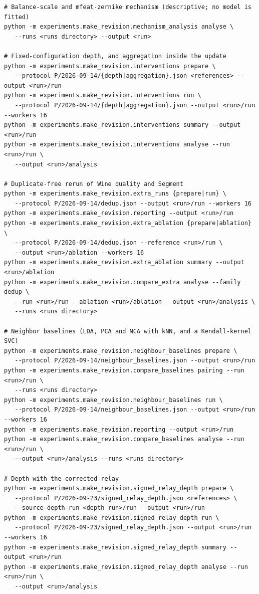 \begin{scriptsize}
\begin{verbatim}
# Balance-scale and mfeat-zernike mechanism (descriptive; no model is fitted)
python -m experiments.make_revision.mechanism_analysis analyse \
   --runs <runs directory> --output <run>

# Fixed-configuration depth, and aggregation inside the update
python -m experiments.make_revision.interventions prepare \
   --protocol P/2026-09-14/{depth|aggregation}.json <references> --output <run>/run
python -m experiments.make_revision.interventions run \
   --protocol P/2026-09-14/{depth|aggregation}.json --output <run>/run --workers 16
python -m experiments.make_revision.interventions summary --output <run>/run
python -m experiments.make_revision.interventions analyse --run <run>/run \
   --output <run>/analysis

# Duplicate-free rerun of Wine quality and Segment
python -m experiments.make_revision.extra_runs {prepare|run} \
   --protocol P/2026-09-14/dedup.json --output <run>/run --workers 16
python -m experiments.make_revision.reporting --output <run>/run
python -m experiments.make_revision.extra_ablation {prepare|ablation} \
   --protocol P/2026-09-14/dedup.json --reference <run>/run \
   --output <run>/ablation --workers 16
python -m experiments.make_revision.extra_ablation summary --output <run>/ablation
python -m experiments.make_revision.compare_extra analyse --family dedup \
   --run <run>/run --ablation <run>/ablation --output <run>/analysis \
   --runs <runs directory>

# Neighbor baselines (LDA, PCA and NCA with kNN, and a Kendall-kernel SVC)
python -m experiments.make_revision.neighbour_baselines prepare \
   --protocol P/2026-09-14/neighbour_baselines.json --output <run>/run
python -m experiments.make_revision.compare_baselines pairing --run <run>/run \
   --runs <runs directory>
python -m experiments.make_revision.neighbour_baselines run \
   --protocol P/2026-09-14/neighbour_baselines.json --output <run>/run --workers 16
python -m experiments.make_revision.reporting --output <run>/run
python -m experiments.make_revision.compare_baselines analyse --run <run>/run \
   --output <run>/analysis --runs <runs directory>

# Depth with the corrected relay
python -m experiments.make_revision.signed_relay_depth prepare \
   --protocol P/2026-09-23/signed_relay_depth.json <references> \
   --source-depth-run <depth run>/run --output <run>/run
python -m experiments.make_revision.signed_relay_depth run \
   --protocol P/2026-09-23/signed_relay_depth.json --output <run>/run --workers 16
python -m experiments.make_revision.signed_relay_depth summary --output <run>/run
python -m experiments.make_revision.signed_relay_depth analyse --run <run>/run \
   --output <run>/analysis


\end{verbatim}
\end{scriptsize}

